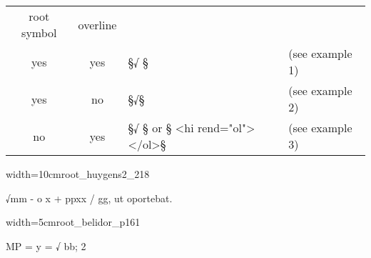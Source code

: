 \vspace{3mm}
\begin{tabelle}

\vspace{-1mm}
\begin{tabular}{@{}cc@{\qquad}l@{\qquad}l}
root symbol & overline & & \\[2mm]
yes & yes & §√{ }§ & (see example 1) \\[1mm]
yes & no & §√§ & (see example 2) \\[1mm]
no & yes & §√{ }§ or § <hi rend="ol"> </ol>§ & (see example 3) \\
\end{tabular}
\end{tabelle}

\vspace{7mm}
\begin{sampleImageSmall}{width=10cm}{root_huygens2_218}
\begin{typeLatin}
√mm - o x + \lwr ppxx / gg, ut oportebat. \\
\end{typeLatin}
\end{sampleImageSmall}

\vspace{3mm}
\begin{sampleImageSmall}{width=5cm}{root_belidor_p161}
\begin{typeLatin}
MP = y =  √ \bold{\{}bb;\bold{\}} \bold{/} 2  \\
\end{typeLatin}
\end{sampleImageSmall}



